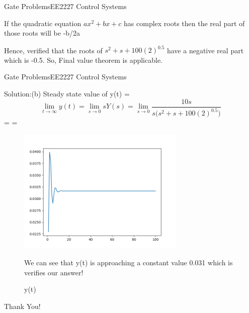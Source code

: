 \documentclass[14pt,aspectratio=169]{beamer}
\newcommand{\TT}{EE2227 Control Systems}
\newcommand{\TB}{Gate Problems}
\begin{document}
\begin{frame}{\TB}{\TT}
 
  If the quadratic equation $ax^2 + bx + c$ has complex roots then the real part of those roots will be -b/2a
  
  Hence, verified that the roots of $s^2+ s + 100{(2)^{0.5}}$ have a negative real part which is -0.5. So, Final value theorem is applicable.
 
\end{frame}
\begin{frame}{\TB}{\TT}
 \begin{block}{Solution:(b)}
 Steady state value of y(t) = \[ \lim_{t \to \infty} y(t) = \lim_{s \to 0} sY(s) = \lim_{s \to 0} \dfrac{10s}{s(s^2+ s + 100{(2)^{0.5})}} \]   
 \centering
 =  =  
\end{block}
\end{frame}

\begin{figure}[htp]
    \centering
    \includegraphics[width=8cm]{shru1.png}
    \caption{ y(t)}
    \label{steady state}
We can see that y(t) is approaching a constant value 0.031 which is verifies our answer!
    
\end{figure}
\begin{frame}




 

\large
\centering
Thank You!


\end{frame}
\end{document}
